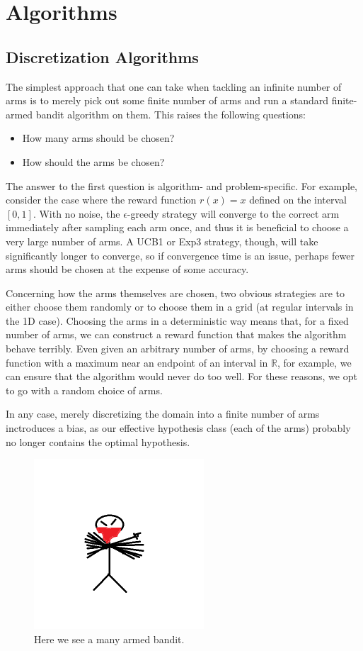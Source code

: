 \documentclass{article}
\begin{document}
\section{Algorithms}
\subsection{Discretization Algorithms}
The simplest approach that one can take when tackling an infinite number of
arms is to merely pick out some finite number of arms and run a standard
finite-armed bandit algorithm on them.  This raises the following 
questions:
\begin{itemize}
\item How many arms should be chosen?
\item How should the arms be chosen?
\end{itemize}
The answer to the first question is algorithm- and problem-specific.  For
example, consider the case where the reward function $r(x) = x$ defined
on the interval $[0,1]$.  With no noise, the $\epsilon$-greedy strategy
will converge to the correct arm immediately after sampling each arm once,
and thus it is beneficial to choose a very large number of arms.  A
UCB1 or Exp3 strategy, though, will take significantly longer to
converge, so if convergence time is an issue, perhaps fewer arms should be
chosen at the expense of some accuracy.

Concerning how the arms themselves are chosen, two obvious strategies are
to either choose them randomly or to choose them in a grid (at regular
intervals in the 1D case).  Choosing the arms in a deterministic way
means that, for a fixed number of arms, we can construct a reward function
that makes the algorithm behave terribly.  Even given an arbitrary number
of arms, by choosing a reward function with a maximum near an endpoint of
an interval in $\mathbb{R}$, for example, we can ensure that the algorithm
would never do too well.  For these reasons, we opt to go with a random
choice of arms.

In any case, merely discretizing the domain into a finite number of arms
inctroduces a bias, as our effective hypothesis class (each of the arms)
probably no longer contains the optimal hypothesis.


\begin{figure}
 \centering
 \includegraphics[width=240px]{./image.png}
 \caption{Here we see a many armed bandit.}
 \label{manyarms}
\end{figure}
\end{document}
